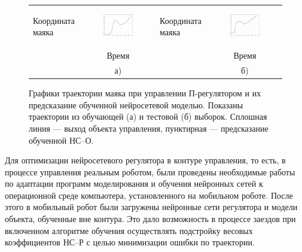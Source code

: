 \begin{figure}
\centering
\begin{tabular}{lclc}
  \begin{sideways}
    {\hspace{1.7cm}\small Координата маяка}
  \end{sideways}
  &
  \includegraphics[width=0.45\textwidth,%
    totalheight=0.25\textheight]{moby_nnp_learn_no_title}
  &
  \begin{sideways}
    {\hspace{1.7cm}\small Координата маяка}
  \end{sideways}
  &
  \includegraphics[width=0.45\textwidth,%
    totalheight=0.25\textheight]{moby_nnp_test_no_title}
  \\
  & {\small Время} & & {\small Время}\\
  & а) & & б)\\
\end{tabular}
\caption{Графики траектории маяка при управлении П-регулятором и их
предсказание обученной нейросетевой моделью.  Показаны траектории
из обучающей (а) и тестовой (б) выборок.  Сплошная линия --- выход объекта
управления, пунктирная --- предсказание обученной НС--О.}
\label{fig:moby_nnp}
\end{figure}


Для оптимизации нейросетевого регулятора в контуре управления, то
есть, в процессе управления реальным роботом, были проведены
необходимые работы по адаптации программ моделирования и обучения
нейронных сетей к операционной среде компьютера, установленного на
мобильном роботе.  После этого в мобильный робот были загружены
нейронные сети регулятора и модели объекта, обученные вне контура.
Это дало возможность в процессе заездов при включенном алгоритме
обучения осуществлять подстройку весовых коэффициентов НС--Р с целью
минимизации ошибки по траектории.

